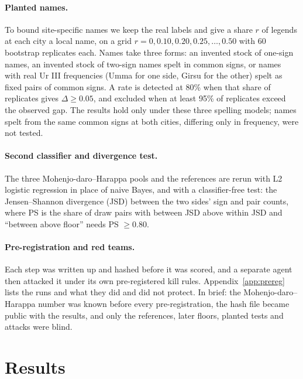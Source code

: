 \documentclass[11pt,a4paper]{article}
\begin{document}
\paragraph{Planted names.} To bound site-specific names we keep the real labels and give a share $r$ of legends at each city a local name, on a grid $r = 0, 0.10, 0.20, 0.25, \ldots, 0.50$ with 60 bootstrap replicates each. %
Names take three forms: an invented stock of one-sign names, an invented stock of two-sign names spelt in common signs, or names with real Ur III frequencies (Umma for one side, Girsu for the other) spelt as fixed pairs of common signs.
A rate is detected at 80\% when that share of replicates gives $\Delta \geq 0.05$, and excluded when at least 95\% of replicates exceed the observed gap.
The results hold only under these three spelling models; names spelt from the same common signs at both cities, differing only in frequency, were not tested.

\paragraph{Second classifier and divergence test.} The three Mohenjo-daro--Harappa pools and the references are rerun with L2 logistic regression in place of naive Bayes, and with a classifier-free test: the Jensen--Shannon divergence (JSD) between the two sides' sign and pair counts, where PS is the share of draw pairs with between JSD above within JSD and ``between above floor'' needs PS $\geq 0.80$. %

\paragraph{Pre-registration and red teams.} Each step was written up and hashed before it was scored, and a separate agent then attacked it under its own pre-registered kill rules.
Appendix~\ref{app:prereg} lists the runs and what they did and did not protect.
In brief: the Mohenjo-daro--Harappa number was known before every pre-registration, the hash file became public with the results, and only the references, later floors, planted tests and attacks were blind. %

\section{Results}
\label{sec:results}
\end{document}
